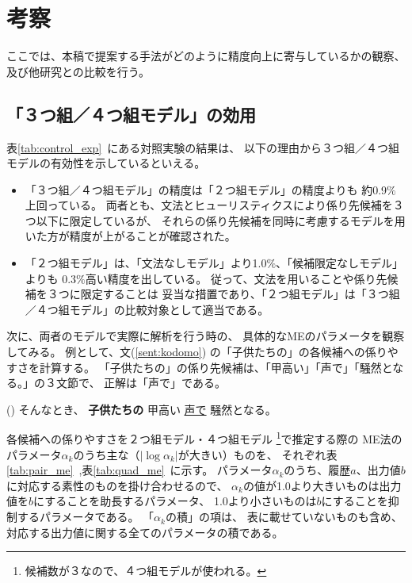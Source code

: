 \section{考察}\label{sec:observations}

ここでは、本稿で提案する手法がどのように精度向上に寄与しているかの観察、
及び他研究との比較を行う。

\subsection{「３つ組／４つ組モデル」の効用}

表\ref{tab:control_exp}~にある対照実験の結果は、
以下の理由から３つ組／４つ組モデルの有効性を示しているといえる。

\begin{itemize}
\item
「３つ組／４つ組モデル」の精度は「２つ組モデル」の精度よりも
約0.9$\%$上回っている。
両者とも、文法とヒューリスティクスにより係り先候補を３つ以下に限定しているが、
それらの係り先候補を同時に考慮するモデルを用いた方が精度が上がることが確認された。
\item
「２つ組モデル」は、「文法なしモデル」より1.0$\%$、「候補限定なしモデル」よりも
0.3$\%$高い精度を出している。
従って、文法を用いることや係り先候補を３つに限定することは
妥当な措置であり、「２つ組モデル」は「３つ組／４つ組モデル」の比較対象として適当である。
\end{itemize}

次に、両者のモデルで実際に解析を行う時の、
具体的なMEのパラメータを観察してみる。
例として、文(\ref{sent:kodomo})
の「子供たちの」の各候補への係りやすさを計算する。
「子供たちの」の係り先候補は、「甲高い」「声で」「騒然となる。」の３文節で、
正解は「声で」である。

\vskip 2mm
\label{sent:kodomo}
(\theenums)  そんなとき、 {\bf 子供たちの} 甲高い \underline{声で} 騒然となる。
\vskip 2mm

各候補への係りやすさを２つ組モデル・４つ組モデル
\footnote{候補数が３なので、４つ組モデルが使われる。}で推定する際の
ME法のパラメータ$\alpha_k$のうち主な（$| \log\alpha_k |$が大きい）ものを、
それぞれ表\ref{tab:pair_me}~,表\ref{tab:quad_me}~に示す。
パラメータ$\alpha_k$のうち、履歴$a$、出力値$b$に対応する素性のものを掛け合わせるので、
$\alpha_k$の値が1.0より大きいものは出力値を$b$にすることを助長するパラメータ、
1.0より小さいものは$b$にすることを抑制するパラメータである。
「$\alpha_k$の積」の項は、
表に載せていないものも含め、
対応する出力値に関する全てのパラメータの積である。

